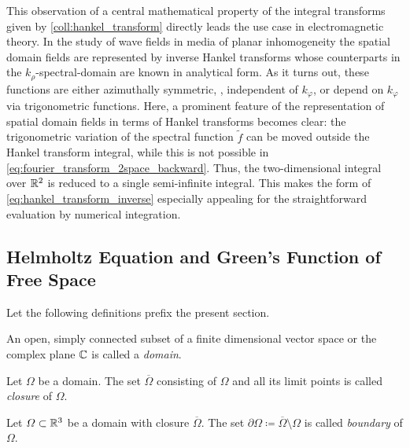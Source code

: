 This observation of a central mathematical property of the integral transforms
given by \cref{coll:hankel_transform} directly leads the use case in
electromagnetic theory.
In the study of wave fields in media of planar inhomogeneity the spatial domain
fields are represented by inverse Hankel transforms whose counterparts in the 
$k_\rho$-spectral-domain are known in analytical form.
As it turns out, these functions are either azimuthally symmetric, \ie,
independent of $k_\varphi$, or depend on $k_\varphi$ via trigonometric
functions. 
Here, a prominent feature of the representation of spatial domain fields in
terms of Hankel transforms becomes clear: the trigonometric variation of the
spectral function $\tilde{f}$
can be moved outside the Hankel transform integral, while this is not
possible in \eqref{eq:fourier_transform_2space_backward}.
Thus, the two-dimensional integral over $\mathbb{R}^2$ is reduced to a single
semi-infinite integral.
This makes the form of \eqref{eq:hankel_transform_inverse} especially appealing
for the straightforward evaluation by numerical integration.








\subsection{Helmholtz Equation and Green's Function of Free Space}

Let the following definitions prefix the present section.
\begin{definition}[Domain]
	An open, simply connected subset of a finite dimensional vector space or
	the complex plane $\mathbb{C}$ is
	called a \emph{domain}.
\end{definition}
\begin{definition}[Closure]
	Let $\Omega$ be a domain.
	The set $\overline{\Omega}$ consisting of $\Omega$ and all its limit points
	is called \emph{closure} of $\Omega$.
\end{definition}
\begin{definition}[Boundary]
	Let $\Omega \subset \mathbb{R}^3$ be a domain with closure $\overline{\Omega}$.
	The set $\partial\Omega \coloneqq \overline{\Omega}\setminus\Omega$
	is called \emph{boundary} of $\Omega$.
\end{definition}

